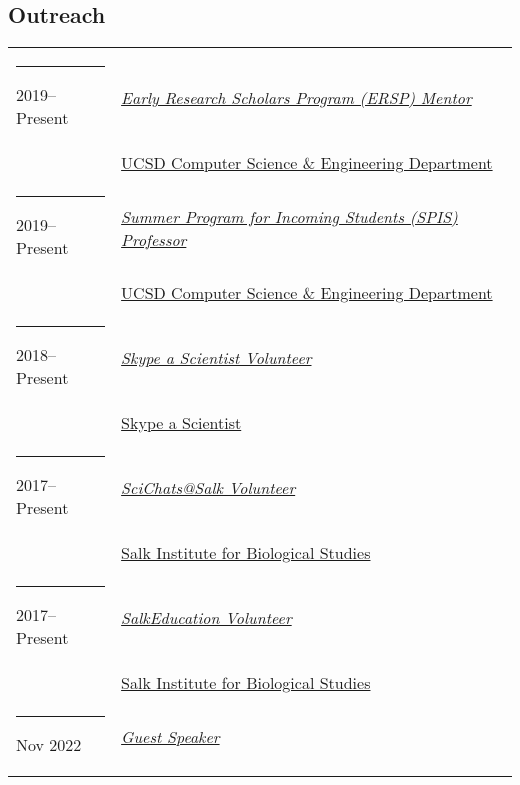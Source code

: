 \documentclass[margin,line]{res}
\begin{document}
\begin{resume}
\section{\sc Outreach}
\begin{longtable}{@{}p{0.7in}p{4in}}\rule{-1mm}{4.5mm}
\hspace*{-4mm} 2019--Present & \href{http://ersp.ucsd.edu/}{\textit{Early Research Scholars Program (ERSP) Mentor}}\\*
\hspace*{-4mm} & \hspace{4mm} \href{http://cse.ucsd.edu}{UCSD Computer Science \& Engineering Department}\\
\hspace*{-4mm} \rule{-1mm}{5mm} 2019--Present & \href{https://sites.google.com/a/eng.ucsd.edu/spis}{\textit{Summer Program for Incoming Students (SPIS) Professor}}\\*
\hspace*{-4mm} & \hspace{4mm} \href{http://cse.ucsd.edu}{UCSD Computer Science \& Engineering Department}\\
\hspace*{-4mm} \rule{-1mm}{5mm} 2018--Present & \href{https://www.skypeascientist.com/}{\textit{Skype a Scientist Volunteer}}\\*
\hspace*{-4mm} & \hspace{4mm} \href{https://www.skypeascientist.com/}{Skype a Scientist}\\
\hspace*{-4mm} \rule{-1mm}{5mm} 2017--Present & \href{http://education.salk.edu/scientist-profile-niema-moshiri/}{\textit{SciChats@Salk Volunteer}}\\*
\hspace*{-4mm} & \hspace{4mm} \href{https://www.salk.edu/}{Salk Institute for Biological Studies}\\
\hspace*{-4mm} \rule{-1mm}{5mm} 2017--Present & \href{https://www.salk.edu/about/education-outreach/}{\textit{SalkEducation Volunteer}}\\*
\hspace*{-4mm} & \hspace{4mm} \href{https://www.salk.edu/}{Salk Institute for Biological Studies}\\
\hspace*{-4mm} \rule{-1mm}{5mm} Nov 2022 & \href{https://uchs.sandiegounified.org/}{\textit{Guest Speaker}}\\*

\end{longtable}
\end{resume}
\end{document}

